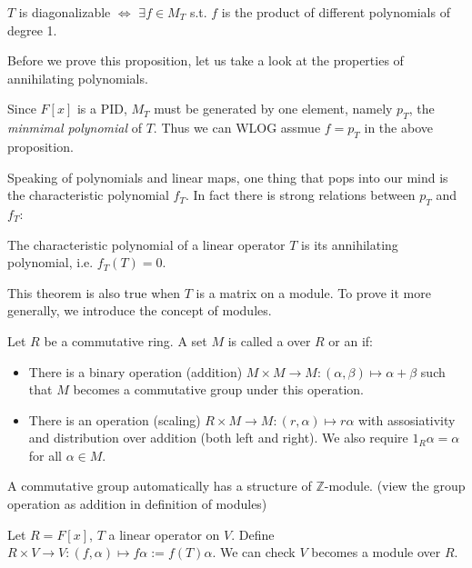 \begin{proposition}
	\label{p_t decomposition}
	$T$ is diagonalizable $\iff$ $\exists f\in M_T$ s.t. $f$ is
	the product of different polynomials of degree 1.
\end{proposition}

Before we prove this proposition, let us take a look at the properties
of annihilating polynomials.

Since $F[x]$ is a PID, $M_T$ must be generated by one element,
namely $p_T$, the \textit{minmimal polynomial} of $T$.
Thus we can WLOG assmue $f=p_T$ in the above proposition.

Speaking of polynomials and linear maps, one thing that pops
into our mind is the characteristic polynomial $f_T$. In
fact there is strong relations between $p_T$ and $f_T$:

\begin{theorem}
	\label{C-H}
    The characteristic polynomial of a linear operator $T$ is
	its annihilating polynomial, i.e. $f_T(T) = 0$.
\end{theorem}
This theorem is also true when $T$ is a matrix on a module.
To prove it more generally, we introduce the concept of modules.

\begin{definition}
	Let $R$ be a commutative ring. A set $M$ is called a  over $R$
	or an  if:
	\begin{itemize}
		\item There is a binary operation (addition)
			$M\times M\to M: (\alpha,\beta)\mapsto \alpha+\beta$
			such that $M$ becomes a commutative group under this operation.
		\item There is an operation (scaling)
			$R\times M\to M: (r, \alpha)\mapsto r\alpha$ with
			assosiativity and distribution over addition (both left and right).
			We also require $1_R\alpha = \alpha$ for all  $\alpha\in M$.
	\end{itemize}
\end{definition}

\begin{example}
    A commutative group automatically has a structure of $\mathbb{Z}$-module.
	(view the group operation as addition in definition of modules)
\end{example}
\begin{example}
	Let $R = F[x]$,  $T$ a linear operator on  $V$.
	Define  $R\times V\to V: (f, \alpha)\mapsto f\alpha := f(T)\alpha$.
	We can check $V$ becomes a module over $R$.
\end{example}

